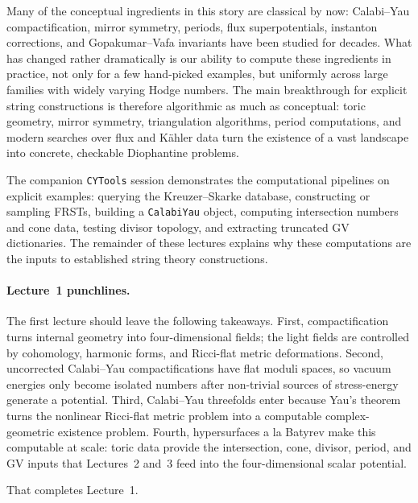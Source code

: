 Many of the conceptual ingredients in this story are classical by now: Calabi--Yau compactification, mirror symmetry, periods, flux superpotentials, instanton corrections, and Gopakumar--Vafa invariants have been studied for decades. What has changed rather dramatically is our ability to compute these ingredients in practice, not only for a few hand-picked examples, but uniformly across large families with widely varying Hodge numbers. The main breakthrough for explicit string constructions is therefore algorithmic as much as conceptual: toric geometry, mirror symmetry, triangulation algorithms, period computations, and modern searches over flux and Kähler data turn the existence of a vast landscape into concrete, checkable Diophantine problems.


The companion \texttt{CYTools} session demonstrates the computational
pipelines on explicit examples: querying the Kreuzer--Skarke database,
constructing or sampling FRSTs, building a \texttt{CalabiYau} object,
computing intersection numbers and cone data, testing divisor
topology, and extracting truncated GV dictionaries. The remainder of
these lectures explains why these computations are the inputs to established string theory
constructions.


\paragraph{Lecture~1 punchlines.}
The first lecture should leave the following takeaways.
First, compactification turns internal geometry into
four-dimensional fields; the light fields are controlled by
cohomology, harmonic forms, and Ricci-flat metric deformations.
Second, uncorrected Calabi--Yau compactifications have flat moduli
spaces, so vacuum energies only become isolated numbers after
non-trivial sources of stress-energy generate a
potential. Third, Calabi--Yau threefolds enter because Yau's theorem
turns the nonlinear Ricci-flat metric problem into a computable
complex-geometric existence problem. Fourth, hypersurfaces a la Batyrev
make this computable at scale: toric data provide the intersection,
cone, divisor, period, and GV inputs that Lectures~2 and~3 feed into
the four-dimensional scalar potential.


That completes Lecture~1.

